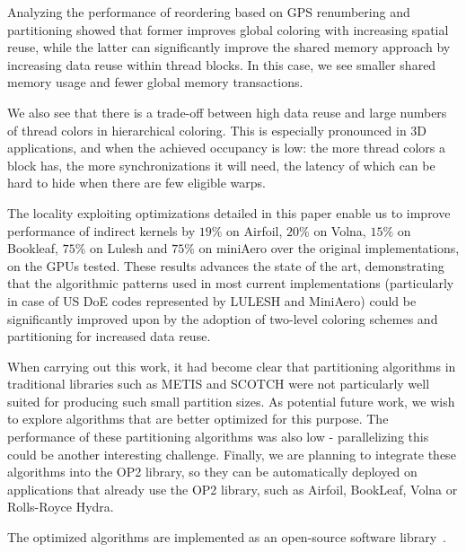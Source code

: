 \documentclass[number]{elsarticle}
\begin{document}
Analyzing the performance of reordering based on GPS renumbering and 
partitioning showed that former improves global coloring with increasing 
spatial reuse, while the latter can significantly improve the shared memory 
approach by increasing data reuse within thread blocks. In this case, we 
see smaller shared memory usage and fewer global memory transactions.

We also see that there is a trade-off between high data reuse and large numbers 
of thread colors in hierarchical coloring. This is especially pronounced in 3D 
applications, and when the achieved occupancy is low: the more thread colors a 
block has, the more synchronizations it will need, the latency of which can be 
hard to hide when there are few eligible warps.

The locality exploiting optimizations detailed in this paper enable us to 
improve performance of indirect kernels by $19\%$ on Airfoil, $20\%$ on 
Volna, $15\%$ on Bookleaf, $75\%$ on Lulesh and $75\%$ on miniAero over the 
original implementations, on the GPUs tested. These results advances the state 
of the art, demonstrating that the algorithmic patterns used in most current 
implementations (particularly in case of US DoE codes represented by 
LULESH and MiniAero) could be significantly improved upon by the adoption of 
two-level coloring schemes and partitioning for increased data reuse.

When carrying out this work, it had become clear that partitioning algorithms in
traditional libraries such as METIS and SCOTCH were not particularly well 
suited for producing such small partition sizes. As potential future work, we 
wish to explore algorithms that are better optimized for this purpose. The 
performance of these partitioning algorithms was also low - parallelizing this 
could be another interesting challenge. Finally, we are planning to integrate 
these algorithms into the OP2 library, so they can be automatically deployed on 
applications that already use the OP2 library, such as Airfoil, BookLeaf, Volna 
or Rolls-Royce Hydra.

The optimized algorithms are implemented as an open-source software 
library~\cite{opt-library}. 
\end{document}
